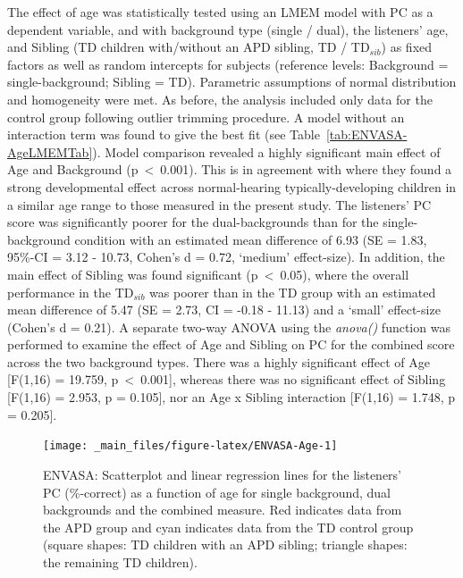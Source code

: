 \documentclass[a4paper, twoside]{templates/ociamthesis}
\begin{document}
The effect of age was statistically tested using an LMEM model with PC as a dependent variable, and with background type (single / dual), the listeners' age, and Sibling (TD children with/without an APD sibling, TD / TD\(_{sib}\)) as fixed factors as well as random intercepts for subjects (reference levels: Background = single-background; Sibling = TD). Parametric assumptions of normal distribution and homogeneity were met. As before, the analysis included only data for the control group following outlier trimming procedure. A model without an interaction term was found to give the best fit (see Table~\ref{tab:ENVASA-AgeLMEMTab}). Model comparison revealed a highly significant main effect of Age and Background (p~\textless~0.001). This is in agreement with \textcite{Krishnan2013} where they found a strong developmental effect across normal-hearing typically-developing children in a similar age range to those measured in the present study. The listeners' PC score was significantly poorer for the dual-backgrounds than for the single-background condition with an estimated mean difference of 6.93 (SE = 1.83, 95\%-CI = 3.12 - 10.73, Cohen's d = 0.72, `medium' effect-size). In addition, the main effect of Sibling was found significant (p~\textless~0.05), where the overall performance in the TD\(_{sib}\) was poorer than in the TD group with an estimated mean difference of 5.47 (SE = 2.73, CI = -0.18 - 11.13) and a `small' effect-size (Cohen's d = 0.21). A separate two-way ANOVA using the \emph{anova()} function was performed to examine the effect of Age and Sibling on PC for the combined score across the two background types. There was a highly significant effect of Age {[}F(1,16) = 19.759, p~\textless~0.001{]}, whereas there was no significant effect of Sibling {[}F(1,16) = 2.953, p = 0.105{]}, nor an Age x Sibling interaction {[}F(1,16) = 1.748, p = 0.205{]}.\\

\begin{figure}

{\centering \texttt{[image: \_main\_files/figure-latex/ENVASA-Age-1]} 

}

\caption{ENVASA: Scatterplot and linear regression lines for the listeners' PC (\%-correct) as a function of age for single background, dual backgrounds and the combined measure. Red indicates data from the APD group and cyan indicates data from the TD control group (square shapes: TD children with an APD sibling; triangle shapes: the remaining TD children).}\label{fig:ENVASA-Age}
\end{figure}
\end{document}
